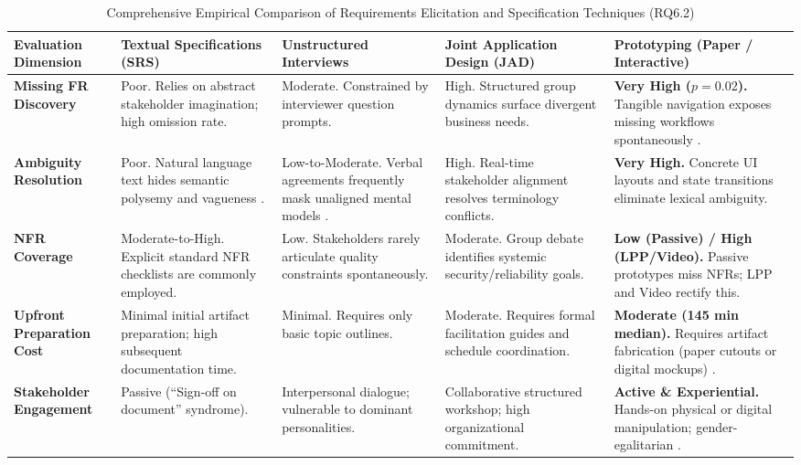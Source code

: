 \documentclass[conference]{IEEEtran}
\begin{document}
\begin{table}[t]
\centering
\caption{Comprehensive Empirical Comparison of Requirements Elicitation and Specification Techniques (RQ6.2)}
\label{tab:comparative_matrix}
\begin{tabularx}{\textwidth}{>{\hsize=0.80\hsize\raggedright\arraybackslash}X >{\hsize=1.05\hsize\raggedright\arraybackslash}X >{\hsize=1.05\hsize\raggedright\arraybackslash}X >{\hsize=1.05\hsize\raggedright\arraybackslash}X >{\hsize=1.05\hsize\raggedright\arraybackslash}X}
\toprule
\textbf{Evaluation Dimension} & \textbf{Textual Specifications (SRS)} & \textbf{Unstructured Interviews} & \textbf{Joint Application Design (JAD)} & \textbf{Prototyping (Paper / Interactive)} \\
\midrule
\textbf{Missing FR Discovery} & Poor. Relies on abstract stakeholder imagination; high omission rate. & Moderate. Constrained by interviewer question prompts. & High. Structured group dynamics surface divergent business needs. & \textbf{Very High ($p = 0.02$).} Tangible navigation exposes missing workflows spontaneously \cite{rueda2020requirements}. \\
\addlinespace
\textbf{Ambiguity Resolution} & Poor. Natural language text hides semantic polysemy and vagueness \cite{cascon2025ambiguity}. & Low-to-Moderate. Verbal agreements frequently mask unaligned mental models \cite{ferrari2016ambiguity}. & High. Real-time stakeholder alignment resolves terminology conflicts. & \textbf{Very High.} Concrete UI layouts and state transitions eliminate lexical ambiguity. \\
\addlinespace
\textbf{NFR Coverage} & Moderate-to-High. Explicit standard NFR checklists are commonly employed. & Low. Stakeholders rarely articulate quality constraints spontaneously. & Moderate. Group debate identifies systemic security/reliability goals. & \textbf{Low (Passive) / High (LPP/Video).} Passive prototypes miss NFRs; LPP \cite{abad2018loud} and Video \cite{bano2023videos} rectify this. \\
\addlinespace
\textbf{Upfront Preparation Cost} & Minimal initial artifact preparation; high subsequent documentation time. & Minimal. Requires only basic topic outlines. & Moderate. Requires formal facilitation guides and schedule coordination. & \textbf{Moderate (145 min median).} Requires artifact fabrication (paper cutouts or digital mockups) \cite{rueda2020requirements}. \\
\addlinespace
\textbf{Stakeholder Engagement} & Passive (``Sign-off on document'' syndrome). & Interpersonal dialogue; vulnerable to dominant personalities. & Collaborative structured workshop; high organizational commitment. & \textbf{Active \& Experiential.} Hands-on physical or digital manipulation; gender-egalitarian \cite{diaz2021gender}. \\
\bottomrule
\end{tabularx}
\end{table}
\end{document}
